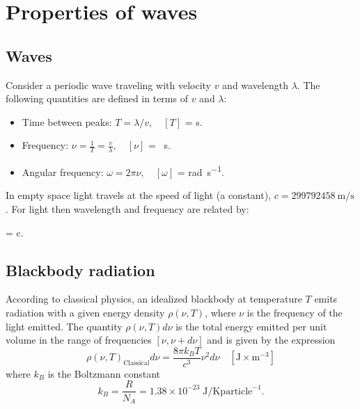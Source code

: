 \documentclass[../Main/chem331-notes.tex]{subfiles}
\begin{document}
\section{Properties of waves}
\subsection{Waves}
Consider a periodic wave traveling with velocity $v$ and wavelength $\lambda$.
 The following quantities are defined in terms of $v$ and $\lambda$:
\begin{itemize}
\item Time between peaks: $T = \lambda / v, \quad [T]$ = \si{\second}.
\item Frequency: $\nu = \frac{1}{T}=\frac{v}{\lambda},  \quad [\nu]$ = \si{\per\second}.
\item Angular frequency: $\omega = 2\pi \nu,  \quad [\omega]$ = \si{\radian\per\second}.
\end{itemize}

In empty space light travels at the speed of light (a constant), $c = \SI{299792458}{\meter\per\second}$.
For light then wavelength and frequency are related by:
\begin{iequation}
\lambda \nu = c.
\end{iequation}

\subsection{Blackbody radiation}
According to classical physics, an idealized blackbody at temperature $T$ emits radiation with a given energy density
$\rho(\nu,T)$, where $\nu$ is the frequency of the light emitted.
The quantity $\rho(\nu,T) d\nu$ is the total energy emitted per unit volume in the range of frequencies $[\nu,\nu + d\nu]$ and is given by the expression
\begin{equation}
\rho(\nu,T)_\mathrm{Classical} d\nu = \frac{8 \pi k_B T}{c^3} \nu^2 d\nu \quad [\si{\joule\times\meter^{-3}}]
\end{equation}
where $k_B$ is the Boltzmann constant
\begin{equation}
k_B = \frac{R}{N_A} = 1.38 \times 10^{-23}\;\si{\joule\per\kelvin} \text{particle}^{-1}.
\end{equation}
\end{document}
